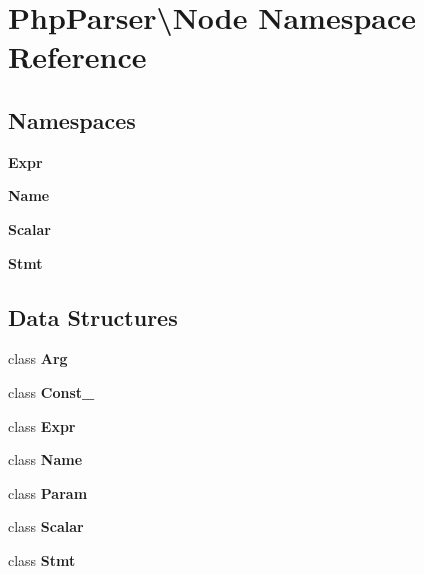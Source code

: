 \section{Php\+Parser\textbackslash{}Node Namespace Reference}
\label{namespace_php_parser_1_1_node}
\subsection*{Namespaces}
\begin{DoxyCompactItemize}
\item 
 {\bf Expr}
\item 
 {\bf Name}
\item 
 {\bf Scalar}
\item 
 {\bf Stmt}
\end{DoxyCompactItemize}
\subsection*{Data Structures}
\begin{DoxyCompactItemize}
\item 
class {\bf Arg}
\item 
class {\bf Const\+\_\+}
\item 
class {\bf Expr}
\item 
class {\bf Name}
\item 
class {\bf Param}
\item 
class {\bf Scalar}
\item 
class {\bf Stmt}
\end{DoxyCompactItemize}
